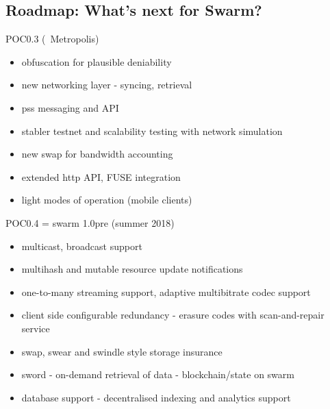 \subsection[Roadmap]{Roadmap: What's next for Swarm?}
\begin{frame}
\begin{block}{POC0.3 (~Metropolis)}
 \begin{itemize}
  \item<1-> obfuscation for plausible deniability
  \item<2-> new networking layer - syncing, retrieval
  \item<3-> pss messaging and API
  \item<4-> stabler testnet and scalability testing with network simulation
  \item<5-> new swap for bandwidth accounting
  \item<6-> extended http API, FUSE integration
  \item<7-> light modes of operation (mobile clients)
 \end{itemize}
\end{block}
\end{frame}

\begin{frame}
\begin{block}{POC0.4 = swarm 1.0pre (summer 2018)}
 \begin{itemize}
  \item<1-> multicast, broadcast support
  \item<2-> multihash and mutable resource update notifications
  \item<3-> one-to-many streaming support, adaptive multibitrate codec support
  \item<4-> client side configurable redundancy - erasure codes with scan-and-repair service
  \item<5-> swap, swear and swindle style storage insurance
  \item<6-> sword - on-demand retrieval of data - blockchain/state on swarm
  \item<7-> database support - decentralised indexing and analytics support
 \end{itemize}
\end{block}
\end{frame}

